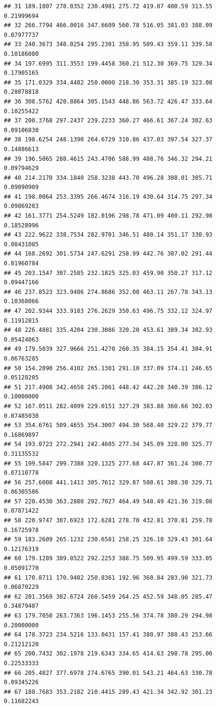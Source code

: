 \documentclass[]{article}
\begin{document}
\begin{verbatim}
## 31 189.1807 278.0352 230.4981 275.72 419.07 400.59 313.55 0.21999694
## 32 266.7794 466.0016 347.6609 560.78 516.05 381.03 388.09 0.07977737
## 33 240.3673 348.0254 295.2301 358.95 509.43 359.11 339.58 0.10186080
## 34 197.6995 311.3553 199.4458 360.21 512.30 369.75 329.34 0.17905165
## 35 171.0329 334.4482 250.0000 218.30 353.31 385.19 323.08 0.28078818
## 36 308.5762 420.8864 305.1543 448.86 563.72 426.47 333.64 0.10255422
## 37 200.3768 297.2437 239.2233 360.27 466.61 367.24 302.63 0.09106830
## 38 198.6254 248.1390 264.6729 310.86 437.03 397.54 327.37 0.14886613
## 39 196.5065 288.4615 243.4706 588.99 488.76 346.32 294.21 0.09794629
## 40 214.2170 334.1840 258.3238 443.70 496.28 308.01 305.71 0.09090909
## 41 198.0064 253.3395 266.4674 316.19 430.64 314.75 297.34 0.09869203
## 42 161.3771 254.5249 182.0196 298.78 471.09 400.11 292.98 0.18528996
## 43 222.9622 338.7534 282.9701 346.51 480.14 351.17 330.93 0.08431085
## 44 168.2692 301.5734 247.6291 258.99 442.76 387.02 291.44 0.01960784
## 45 203.1547 307.2585 232.1825 325.03 459.90 350.27 317.12 0.09447166
## 46 237.8523 323.9486 274.8686 352.08 463.11 267.78 343.13 0.10368066
## 47 202.9344 333.9183 276.2629 350.63 496.75 332.12 324.97 0.11912815
## 48 226.4881 335.4204 230.3086 320.20 453.61 389.34 302.93 0.05424063
## 49 179.5039 327.9666 251.4270 260.35 384.15 354.41 304.91 0.06763285
## 50 154.2090 256.4102 265.1301 291.10 337.09 374.11 246.65 0.05128205
## 51 217.4908 342.4658 245.2061 448.42 442.20 340.39 386.12 0.10000000
## 52 167.0511 282.4099 229.0151 327.29 383.88 360.66 302.03 0.07485030
## 53 354.6761 509.4655 354.3007 494.30 568.40 329.22 379.77 0.16869897
## 54 193.0723 272.2941 242.4605 277.34 345.09 328.00 325.77 0.31135532
## 55 199.5847 299.7388 320.1325 277.68 447.87 361.24 300.77 0.07110778
## 56 257.6008 441.1413 305.7612 329.87 508.61 380.30 329.71 0.06305506
## 57 220.4530 363.2880 292.7027 464.49 548.49 421.36 319.08 0.07871422
## 58 220.9747 307.6923 172.6281 278.70 432.81 370.81 259.78 0.16725978
## 59 183.2609 265.1232 230.6581 258.25 326.10 329.43 301.64 0.12176319
## 60 179.1289 389.8522 292.2253 388.75 509.95 499.59 333.05 0.05091770
## 61 170.8711 170.9402 250.8361 192.96 360.84 283.90 321.73 0.06870229
## 62 201.3569 302.6724 260.5459 264.25 452.59 348.05 285.47 0.34879407
## 63 179.7050 263.7363 196.1453 255.56 374.78 380.29 294.98 0.20000000
## 64 178.3723 234.5216 133.0431 157.41 380.97 388.43 253.66 0.21212120
## 65 200.7432 302.1978 219.6343 334.65 414.63 298.78 295.00 0.22533333
## 66 205.4827 377.6978 274.6765 390.01 543.21 464.63 330.78 0.09345226
## 67 188.7683 353.2182 210.4415 289.43 421.34 342.92 301.23 0.11682243

\end{verbatim}
\end{document}
